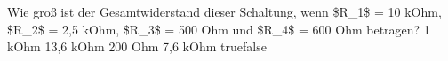     {Wie groß ist der Gesamtwiderstand dieser Schaltung, wenn \$R\_1\$ = 10 kOhm, \$R\_2\$ = 2,5 kOhm, \$R\_3\$ = 500 Ohm und \$R\_4\$ = 600 Ohm betragen? }
    {1 kOhm}
    {13,6 kOhm}
    {200 Ohm}
    {7,6 kOhm}
    {true}{false}